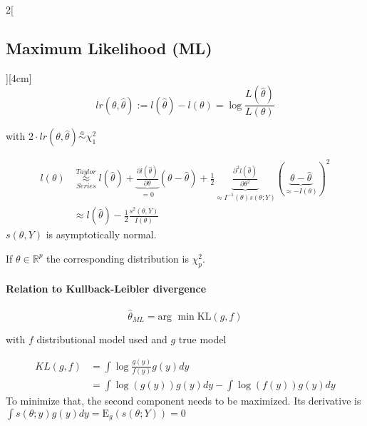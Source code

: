 \documentclass[8pt]{extarticle}
\begin{document}
\begin{multicols}{2}[\subsection{Maximum Likelihood (ML)}][4cm]
$$lr(\theta,\hat{\theta}) := l(\hat{\theta}) - l(\theta) = \log \frac{L(\hat{\theta})}{L(\theta)}$$

with $2\cdot lr(\theta,\hat{\theta}) \overset{a}{\sim} \chi^2_1$

\begin{Proof}
\vspace{-1.5em}
\begin{align*}
l(\theta) & \overset{Taylor}{\underset{Series}{\approx}} l(\hat{\theta}) + \underbrace{\frac{\partial l(\hat{\theta})}{\partial \theta}}_{=0} (\theta - \hat{\theta}) + \frac{1}{2}\underbrace{\frac{\partial^2 l(\hat{\theta})}{\partial \theta^2}}_{\approx I^{-1}(\theta)s(\theta;Y)}(\underbrace{\theta - \hat{\theta}}_{\approx -I(\theta)})^2\\
&\approx l(\hat{\theta}) - \frac{1}{2} \frac{s^2(\theta, Y)}{I(\theta)}
\end{align*}
$s(\theta,Y)$ is asymptotically normal.
\end{Proof}

If $\theta \in \mathbb{R}^p$ the corresponding distribution is $\chi^2_p$.

\paragraph{Relation to Kullback-Leibler divergence} 

$$\hat{\theta}_{ML} = \text{arg }\min \text{KL}(g,f)$$

with $f$ distributional model used and $g$ true model

\begin{Proof}
\vspace{-1.5em}
\begin{align*}
KL(g,f) &= \int \log\frac{g(y)}{f(y)} g(y) dy\\
&= \int \log(g(y)) g(y) dy - \int \log(f(y)) g(y) dy
\end{align*}
To minimize that, the second component needs to be maximized. Its derivative is $\int s(\theta;y)g(y)dy = \mathrm{E}_g(s(\theta;Y)) = 0$
\end{Proof}
  

\end{multicols}
\end{document}
